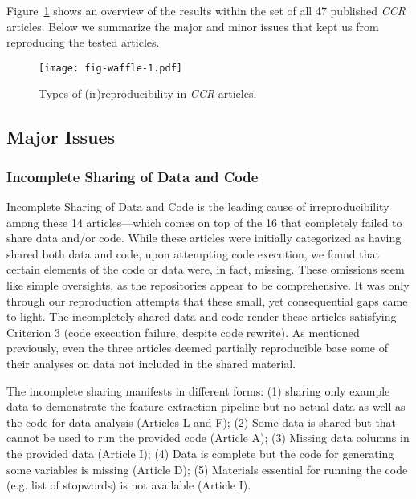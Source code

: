 Figure~\ref{fig:waffle} shows an overview of the results within the set of all 47 published \textit{CCR} articles.
Below we summarize the major and minor issues that kept us from reproducing the tested articles.

\begin{figure}
\texttt{[image: fig-waffle-1.pdf]}
\caption{Types of (ir)reproducibility in \textit{CCR} articles.}
\label{fig:waffle}
\end{figure}


\subsection{Major Issues}

\subsubsection{Incomplete Sharing of Data and Code}

Incomplete Sharing of Data and Code is the leading cause of irreproducibility among these 14 articles---which comes on top of the 16 that completely failed to share data and/or code. While these articles were initially categorized as having shared both data and code, upon attempting code execution, we found that certain elements of the code or data were, in fact, missing. These omissions seem like simple oversights, as the repositories appear to be comprehensive. It was only through our reproduction attempts that these small, yet consequential gaps came to light. The incompletely shared data and code render these articles satisfying Criterion 3 (code execution failure, despite code rewrite). As mentioned previously, even the three articles deemed partially reproducible base some of their analyses on data not included in the shared material.

The incomplete sharing manifests in different forms: (1) sharing only example data to demonstrate the feature extraction pipeline but no actual data as well as the code for data analysis (Articles L and F); (2) Some data is shared but that cannot be used to run the provided code (Article A); (3) Missing data columns in the provided data (Article I); (4) Data is complete but the code for generating some variables is missing (Article D); (5) Materials essential for running the code (e.g. list of stopwords) is not available (Article I).

